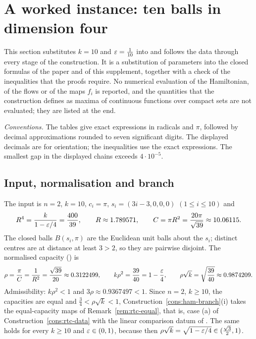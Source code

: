 \section{A worked instance: ten balls in dimension four}\label{sec:example}

This section substitutes $k=10$ and $\varepsilon=\frac1{10}$ into  and follows the data through
every stage of the construction. It is a substitution of parameters into the closed formulas of the paper and of this
supplement, together with a check of the inequalities that the proofs require. No numerical evaluation of the
Hamiltonian, of the flows or of the maps $f_i$ is reported, and the quantities that the construction defines as maxima
of continuous functions over compact sets are not evaluated; they are listed at the end.

\emph{Conventions.} The tables give exact expressions in radicals and $\pi$, followed by decimal approximations
rounded to seven significant digits. The displayed decimals are for orientation; the inequalities use the exact
expressions. The smallest gap in the displayed chains exceeds $4\cdot10^{-5}$.

\subsection{Input, normalisation and branch}

The input is $n=2$, $k=10$, $c_i=\pi$, $s_i=(3i-3,0,0,0)$ $(1\le i\le10)$ and
\[
 R^4=\frac k{1-\varepsilon/4}=\frac{400}{39},\qquad R\approx1.789571,\qquad C=\pi R^2=\frac{20\pi}{\sqrt{39}}\approx10.06115 .
\]
The closed balls $B(s_i,\pi)$ are the Euclidean unit balls about the $s_i$; distinct centres are at distance at least
$3>2$, so they are pairwise disjoint. The normalised capacity () is
\[
 \rho=\frac{\pi}{C}=\frac1{R^2}=\frac{\sqrt{39}}{20}\approx0.3122499,\qquad k\rho^2=\frac{39}{40}=1-\frac{\varepsilon}4,\qquad
 \rho\sqrt k=\sqrt{\frac{39}{40}}\approx0.9874209 .
\]
Admissibility: $k\rho^2<1$ and $3\rho\approx0.9367497<1$. Since $n=2$, $k\ge10$, the capacities are equal and
$\frac34<\rho\sqrt k<1$, Construction~\ref{cons:ham-branch}(i) takes the equal-capacity maps of Remark~\ref{rem:rtc-equal},
that is, case (a) of Construction~\ref{cons:rtc-data} with the linear comparison datum of
. The same holds for every $k\ge10$ and $\varepsilon\in(0,1)$, because then
$\rho\sqrt k=\sqrt{1-\varepsilon/4}\in(\frac{\sqrt3}2,1)$.

